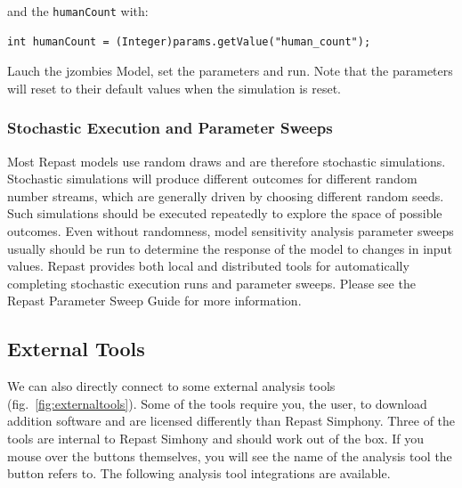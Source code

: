 \documentclass[11pt]{amsart}
\begin{document}
and the \texttt{humanCount} with:

\noindent\begin{minipage}[h]{\textwidth}
\vspace{.2in}
\lstset{language=java,caption=}
\begin{lstlisting}
int humanCount = (Integer)params.getValue("human_count");
\end{lstlisting}

\end{minipage}

Lauch the jzombies Model, set the parameters and run. Note that the parameters will reset to their default values when the simulation is reset.

\subsubsection{Stochastic Execution and Parameter Sweeps}

Most Repast models use random draws and are therefore stochastic simulations. Stochastic simulations will produce different outcomes for different random number streams, which are generally driven by choosing different random seeds. Such simulations should be executed repeatedly to explore the space of possible outcomes. Even without randomness, model sensitivity analysis parameter sweeps usually should be run to determine the response of the model to changes in input values. Repast provides both local and distributed tools for automatically completing stochastic execution runs and parameter sweeps. Please see the Repast Parameter Sweep Guide for more information.

\subsection{External Tools}

We can also directly connect to some external analysis tools (fig.~\ref{fig:externaltools}). Some of the tools require you, the user, to download addition software and are licensed differently than Repast Simphony. Three of the tools are internal to Repast Simhony and should work out of the box. If you mouse over the buttons themselves, you will see the name of the analysis tool the button refers to. The following analysis tool integrations are available.
\end{document}
